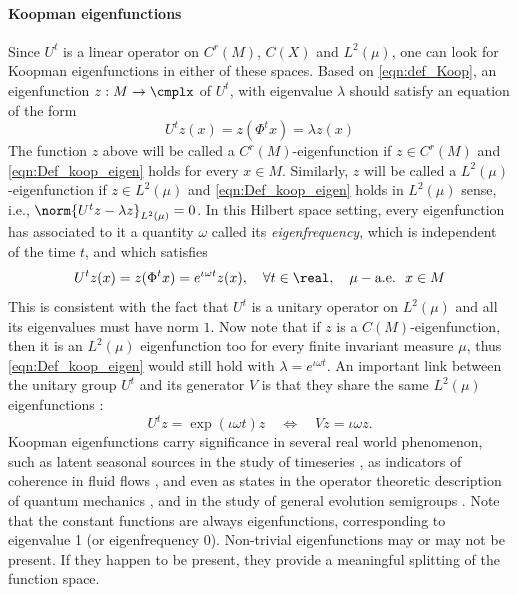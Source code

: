 \documentclass[12pt,oneside]{article}
\begin{document}
\paragraph{Koopman eigenfunctions} Since $U^t$  is a linear operator on $C^r(M)$, $C(X)$ and $L^2(\mu)$, one can  look for Koopman eigenfunctions in either of these spaces. Based on \eqref{eqn:def_Koop}, an eigenfunction $z:M\to\cmplx$ of $U^t$,  with eigenvalue $\lambda$ should satisfy an equation of the form
%
\begin{equation}\label{eqn:Def_koop_eigen}
U^t z (x) = z(\Phi^t x) = \lambda z(x) 
\end{equation}
%
The function $z$ above will be called a $C^r(M)$-eigenfunction if $z\in C^r(M)$ and \eqref{eqn:Def_koop_eigen} holds for every $x\in M$. Similarly, $z$ will be called a $L^2(\mu)$-eigenfunction if $z\in L^2(\mu)$ and \eqref{eqn:Def_koop_eigen} holds in $L^2(\mu)$ sense, i.e., $\norm{ U^t z - \lambda z}_{L^2(\mu)} = 0$. In this Hilbert space setting, every eigenfunction has associated to it a quantity $\omega$ called its \emph{eigenfrequency}, which is independent of the time $t$, and which satisfies
%
\begin{equation}\label{eqn:Koop_eigen_L2}
U^t z (x) = z(\Phi^t x) = e^{\iota \omega t} z(x) , \quad \forall t\in\real, \quad \mu-\text{a.e.} \ \ x\in M
\end{equation}
%
This is consistent with the fact that $U^t$ is a unitary operator on $L^2(\mu)$ and all its eigenvalues must have norm $1$. Now note that if $z$ is a $C(M)$-eigenfunction, then it is an $L^2(\mu)$ eigenfunction too for every finite invariant measure $\mu$, thus \eqref{eqn:Def_koop_eigen} would still hold with $\lambda=e^{\iota \omega t}$.  An important link between the unitary group $U^t$ and its generator $V$ is that they share the same $L^2(\mu)$ eigenfunctions :
%  
\[ U^tz=\exp(\iota \omega t)z \quad \Leftrightarrow \quad Vz=\iota \omega z. \]
%
Koopman eigenfunctions carry significance in several real world phenomenon, such as latent seasonal sources in the study of timeseries \cite{DasMustAgar2023_qpd, DasEtAl2023traffic}, as indicators of coherence in fluid flows \cite{FroylandEtAl14b, DellnitzEtAl00}, and even as states in the operator theoretic description of quantum mechanics \citep[e.g.][]{Eisner2017pointwise}, and in the study of general evolution semigroups \cite{Suchanecki2010evolution, DGJ_compactV_2018, EisnerEtAl15}. Note that the constant functions are always eigenfunctions, corresponding to eigenvalue 1 (or eigenfrequency 0). Non-trivial eigenfunctions may or may not be present. If they happen to be present, they provide a meaningful splitting of the function space.
\end{document}
